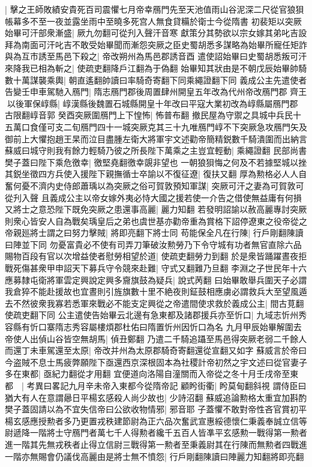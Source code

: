 |{
	擊之王師敗績安貴死百司震懼七月帝幸鴈門先至天池值雨山谷泥深二尺從官狼狽帳幕多不至一夜並露坐雨中至曉多死宫人無食貸糒於衛士今從隋書}
初裴矩以突厥始畢可汗部衆漸盛|{
	厥九勿翻可從刋入聲汗音寒}
獻策分其勢欲以宗女嫁其弟叱吉設拜為南面可汗叱吉不敢受始畢聞而漸怨突厥之臣史蜀胡悉多謀略為始畢所寵任矩詐與為互市誘至馬邑下殺之|{
	帝改朔州為馬邑郡誘音酉}
遣使詔始畢曰史蜀胡悉叛可汗來降我已相為斬之|{
	使疏吏翻降戶江翻為于偽翻}
始畢知其狀由是不朝戊辰始畢帥騎數十萬謀襲乘輿|{
	朝直遙翻帥讀曰率騎奇寄翻下同乘繩證翻下同}
義成公主先遣使者告變壬申車駕馳入鴈門|{
	隋志鴈門郡後周置肆州開皇五年改為代州帝改鴈門郡}
齊王以後軍保崞縣|{
	崞漢縣後魏置石城縣開皇十年改曰平寇大業初改為崞縣屬鴈門郡古限翻崞音郭}
癸酉突厥圍鴈門上下惶怖|{
	怖普布翻}
撤民屋為守禦之具城中兵民十五萬口食僅可支二旬鴈門四十一城突厥克其三十九唯鴈門崞不下突厥急攻鴈門矢及御前上大懼抱趙王杲而泣目盡腫左衛大將軍宇文述勸帝簡精鋭數千騎潰圍而出納言蘇威曰城守則我有餘力輕騎乃彼之所長陛下萬乘之主豈宜輕動|{
	乘繩證翻}
民部尚書樊子蓋曰陛下乘危徼幸|{
	徼堅堯翻徼幸覬非望也}
一朝狼狽悔之何及不若據堅城以挫其鋭坐徵四方兵使入援陛下親撫循士卒諭以不復征遼|{
	復扶又翻}
厚為勲格必人人自奮何憂不濟内史侍郎蕭瑀以為突厥之俗可賀敦預知軍謀|{
	突厥可汗之妻為可賀敦可從刋入聲}
且義成公主以帝女嫁外夷必恃大國之援若使一介告之借使無益庸有何損又將士之意恐陛下既免突厥之患還事高麗|{
	麗力知翻}
若發明詔諭以赦高麗專討突厥則衆心皆安人自為戰矣瑀皇后之弟也虞世基亦勸帝重為賞格下詔停遼東之役帝從之帝親廵將士謂之曰努力擊賊|{
	將即亮翻下將士同}
苟能保全凡在行陳|{
	行戶剛翻陳讀曰陣並下同}
勿憂富貴必不使有司弄刀筆破汝勲勞乃下令守城有功者無官直除六品賜物百段有官以次增益使者慰勞相望於道|{
	使疏吏翻勞力到翻}
於是衆皆踊躍晝夜拒戰死傷甚衆甲申詔天下募兵守令競來赴難|{
	守式又翻難乃旦翻}
李淵之子世民年十六應募隸屯衛將軍雲定興說定興多齎旗鼓為疑兵|{
	說式苪翻}
曰始畢敢舉兵圍天子必謂我倉猝不能赴援故也宜晝則引旌旗數十里不絶夜則鉦鼓相應虜必謂救兵大至望風遁去不然彼衆我寡若悉軍來戰必不能支定興從之帝遣間使求救於義成公主|{
	間古莧翻使疏吏翻下同}
公主遣使告始畢云北邊有急東都及諸郡援兵亦至忻口|{
	九域志忻州秀容縣有忻口寨隋志秀容屬樓煩郡杜佑曰隋置忻州因忻口為名}
九月甲辰始畢解圍去帝使人出偵山谷皆空無胡馬|{
	偵丑鄭翻}
乃遣二千騎追躡至馬邑得突厥老弱二千餘人而還丁未車駕還至太原|{
	帝改并州為太原郡騎奇寄翻還從宣翻又如字}
蘇威言於帝曰今盗賊不息士馬疲弊願陛下亟還西京深根固本為社稷計帝初然之宇文述曰從官妻子多在東都|{
	亟紀力翻從才用翻}
宜便道向洛陽自潼關而入帝從之冬十月壬戌帝至東都　|{
	考異曰畧記九月辛未帝入東都今從隋帝記}
顧盻街衢|{
	盻莫甸翻斜視}
謂侍臣曰猶大有人在意謂曏日平楊玄感殺人尚少故也|{
	少詩沼翻}
蘇威追論勲格太重宜加斟酌樊子蓋固請以為不宜失信帝曰公欲收物情邪|{
	邪音耶}
子蓋懼不敢對帝性吝官賞初平楊玄感應授勲者多乃更置戎秩建節尉為正六品次奮武宣惠綏德懷仁秉義奉誠立信等尉遞降一階將士守鴈門者萬七千人得勲者纔千五百人皆凖平玄感勲一戰得第一勲者進一階其先無戎秩者止得立信尉三戰得第一勲者至秉義尉其在行陳而無勲者四戰進一階亦無賜會仍議伐高麗由是將士無不憤怨|{
	行戶剛翻陳讀曰陣麗力知翻將即亮翻}
